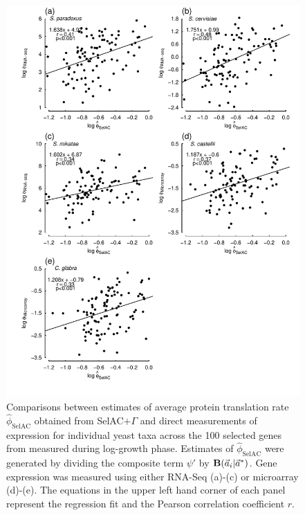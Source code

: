 \documentclass[onecolumn,letterpaper,fleqn,nogrid]{myMBE}%
\newcommand{\Funcaveci}{\ensuremath{\Func(\aveci|\aoptvec)}\xspace}
\newcommand{\Func}{\ensuremath{\text{\textbf{B}}}\xspace}
\newcommand{\selac}{SelAC\xspace}
\newcommand{\selacplusgamma}{SelAC$+\Gamma$\xspace}
\newcommand{\aoptvec}{\ensuremath{\Vec{a}^*}\xspace}
\newcommand{\aveci}{\ensuremath{\Vec{a}_i}\xspace}
\newcommand{\phihat}{\ensuremath{\hat{\phi}_{\text{\selac}}}\xspace}
\newcommand{\psiprime}{\ensuremath{\psi'}\xspace}
\begin{document}
\begin{figure}[H]
  \centering
  \includegraphics[width=0.9\linewidth]{FIGURE_2_SelACwG_vs_Empirical_by_spp_ALLspp.pdf}
  \caption{Comparisons between estimates of average protein translation rate $\phihat$ obtained from \selacplusgamma and direct measurements of expression for individual yeast taxa across the 100 selected genes from \citet{SalichosAndRokas2013} measured during log-growth phase.
        Estimates of $\phihat$ were generated by dividing the composite term $\psiprime$ by \Funcaveci.
        Gene expression was measured using either RNA-Seq (a)-(c) or microarray (d)-(e).
        The equations in the upper left hand corner of each panel represent the regression fit and the Pearson correlation coefficient $r$.
  }
  \label{fig:PhivsEmpirical}
\end{figure}
\end{document}
